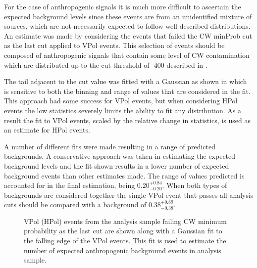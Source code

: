 For the case of anthropogenic signals it is much more difficult to ascertain the expected background levels since these events are from an unidentified mixture of sources, which are not necessarily expected to follow well described distributions. An estimate was made by considering the events that failed the CW minProb cut as the last cut applied to VPol events. This selection of events should be composed of anthropogenic signals that contain some level of CW contamination which are distributed up to the cut threshold of -400 described in . 

The tail adjacent to the cut value was fitted with a Gaussian as shown in  which is sensitive to both the binning and range of values that are considered in the fit. This approach had some success for VPol events, but when considering HPol events the low statistics severely limits the ability to fit any distribution. As a result the fit to VPol events, scaled by the relative change in statistics, is used as an estimate for HPol events.

A number of different fits were made resulting in a range of predicted backgrounds. A conservative approach was taken in estimating the expected background levels and the fit shown results in a lower number of expected background events than other estimates made. The range of values predicted is accounted for in the final estimation, being $0.20^{+0.84}_{-0.20}$. When both types of backgrounds are considered together the single VPol event that passes all analysis cuts should be compared with a background of $0.38^{+0.89}_{-0.38}$.


\begin{figure}[htpb]
\hfill
{}
\caption{VPol (HPol) events from the analysis sample failing CW minimum probability as the last cut are shown along with a Gaussian fit to the falling edge of the VPol events. This fit is used to estimate the number of expected anthropogenic background events in analysis sample.}
\label{fig:Analysis:Background-Estimation:CW-Background}
\end{figure}
